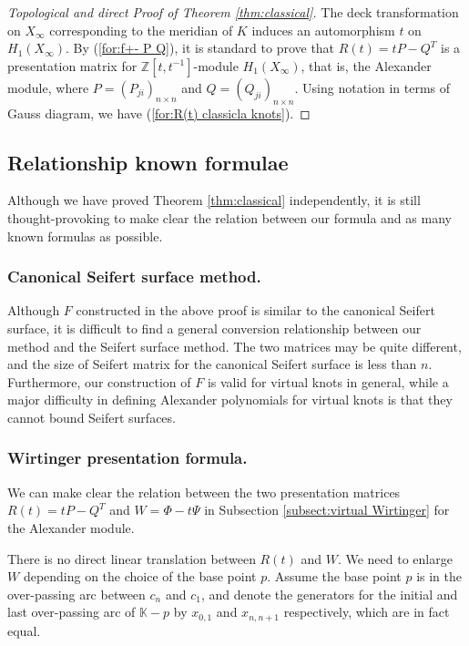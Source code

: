 \documentclass{amsart}
\theoremstyle{definition}
\theoremstyle{remark}
\numberwithin{equation}{subsection}
\begin{document}
\begin{proof}[Topological and direct Proof of Theorem \ref{thm:classical}]
The deck transformation on $X_{\infty}$ corresponding to the meridian of $K$ induces an automorphism $t$ on $H_{1}(X_{\infty})$. By (\ref{for:f+- P Q}), it is standard to prove that $R(t) = tP - Q^{T}$ is a presentation matrix for $\mathbb{Z}[t,t^{-1}]$-module $H_{1}(X_{\infty})$, that is, the Alexander module, where $P = (P_{ji})_{n \times n}$ and $Q = (Q_{ji})_{n \times n}$. Using notation in terms of Gauss diagram, we have (\ref{for:R(t) classicla knots}).
\end{proof}

\subsection{Relationship known formulae}
Although we have proved Theorem \ref{thm:classical} independently, it is still thought-provoking to make clear the relation between our formula and as many known formulas as possible.

\subsubsection{Canonical Seifert surface method.}
Although $F$ constructed in the above proof is similar to the canonical Seifert surface, it is difficult to find a general conversion relationship between our method and the Seifert surface method. The two matrices may be quite different, and the size of Seifert matrix for the canonical Seifert surface is less than $n$. Furthermore, our construction of $F$ is valid for virtual knots in general, while a major difficulty in defining Alexander polynomials for virtual knots is that they cannot bound Seifert surfaces.

\subsubsection{Wirtinger presentation formula.}
We can make clear the relation between the two presentation matrices $R(t) = tP - Q^{T}$ and $W = \Phi - t\Psi$ in Subsection \ref{subsect:virtual Wirtinger} for the Alexander module.

There is no direct linear translation between $R(t)$ and $W$. We need to enlarge $W$ depending on the choice of the base point $p$. Assume the base point $p$ is in the over-passing arc between $c_{n}$ and $c_{1}$, and denote the generators for the initial and last over-passing arc of $\mathbb{K} - p$ by $x_{0,1}$ and $x_{n,n+1}$ respectively, which are in fact equal.
\end{document}
